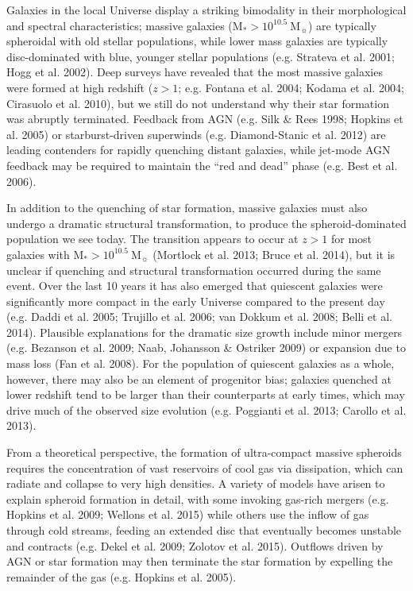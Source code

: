 \documentclass[a4paper,fleqn,usenatbib,useAMS]{mnras}
\begin{document}
Galaxies in the local Universe display a striking bimodality in their
morphological and spectral characteristics; massive galaxies
(M$_{\ast}> 10^{10.5} ~$M$_{\sun}$) are typically spheroidal with old
stellar populations, while lower mass galaxies are typically
disc-dominated with blue, younger stellar populations (e.g. Strateva
et al. 2001; Hogg et al. 2002).  Deep surveys have revealed that the
most massive galaxies were formed at high redshift ($z>1$;
e.g. Fontana et al. 2004; Kodama et al. 2004; Cirasuolo et al. 2010),
but we still do not understand why their star formation was abruptly
terminated. Feedback from AGN (e.g. Silk \& Rees 1998; Hopkins et
al. 2005) or starburst-driven superwinds (e.g. Diamond-Stanic et
al. 2012) are leading contenders for rapidly quenching distant
galaxies, while jet-mode AGN feedback may be required to maintain the
``red and dead'' phase (e.g. Best et al. 2006).

 
In addition to the quenching of star formation, massive galaxies must
also undergo a dramatic structural transformation, to
produce the spheroid-dominated population we see today.  The
transition appears to occur at $z>1$ for most galaxies with M$_{\ast}>
10^{10.5} ~$M$_{\sun}$ (Mortlock et al. 2013; Bruce et al. 2014), but
it is unclear if quenching and structural transformation occurred
during the same event.  Over the last 10 years it has also emerged
that quiescent galaxies were significantly more compact in the early
Universe compared to the present day (e.g. Daddi et al. 2005; Trujillo
et al. 2006; van Dokkum et al. 2008; Belli et al. 2014).  
Plausible explanations for the dramatic size growth include minor mergers
(e.g. Bezanson et al. 2009; Naab, Johansson \& Ostriker
2009) or  expansion due to mass loss (Fan et al. 2008). For the population
of quiescent galaxies as a whole, however, there may also  be an
element of progenitor bias; galaxies quenched at lower redshift tend
to be larger than their counterparts at early times, which may drive
much of the observed size evolution (e.g. Poggianti et al. 2013;
Carollo et al. 2013).


From a theoretical perspective, the formation of ultra-compact massive
spheroids requires the concentration of vast reservoirs of cool gas
via dissipation, which can radiate and collapse to very high
densities. A variety of models have arisen to explain spheroid
formation in detail, with some invoking gas-rich mergers (e.g. Hopkins
et al. 2009; Wellons et al. 2015) while others use the inflow of gas
through cold streams, feeding an extended disc that eventually becomes
unstable and contracts (e.g. Dekel et al. 2009; Zolotov et
al. 2015). Outflows driven by AGN or star formation may then terminate
the star formation by expelling the remainder of the gas (e.g. Hopkins
et al. 2005).
\end{document}
